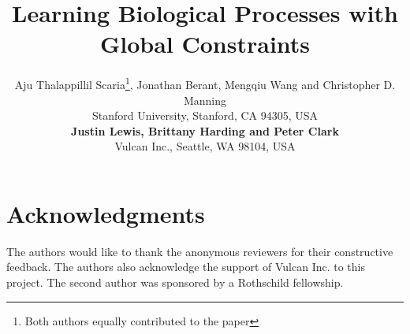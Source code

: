 \documentclass[11pt,letterpaper]{article}
\title{Learning Biological Processes with Global Constraints}
\author{\small{Aju Thalappillil Scaria\thanks{\hspace{5pt}Both authors equally contributed to the paper}, Jonathan Berant\samethanks, Mengqiu Wang and Christopher D. Manning}  \\
 			\small{Stanford University, Stanford, CA 94305, USA} \\ 
			\small{\textbf{Justin Lewis, Brittany Harding and Peter Clark}} \\
			\small{Vulcan Inc., Seattle, WA 98104, USA} \\
}
\begin{document}
\maketitle

 
 \label{sec:intro}
 \label{sec:process}
 \label{sec:model}
 \label{sec:experiment}
 \label{sec:related}
 \label{sec:conclusion}

\section*{Acknowledgments}
The authors would like to thank the anonymous reviewers for their constructive feedback.
The authors also acknowledge the support of Vulcan Inc. to this project.
The second author was sponsored by a Rothschild fellowship. 



\end{document}
